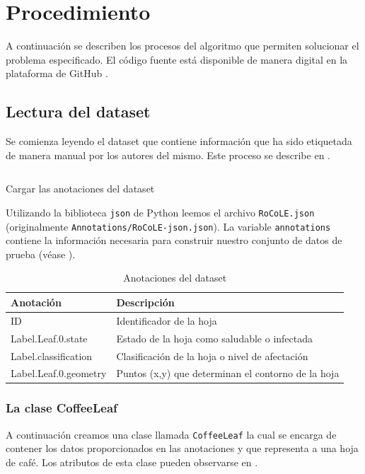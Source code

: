 \chapter{Procedimiento}
A continuación se describen los procesos del algoritmo que permiten solucionar el problema especificado. El código fuente está disponible de manera digital en la plataforma de GitHub \cite{LindermanDgz}.

\section{Lectura del dataset}
Se comienza leyendo el dataset que contiene información que ha sido etiquetada de manera manual por los autores del mismo. Este proceso se describe en .

\begin{listing}[H]
\inputminted{python}{code_listings/load_dataset.py}
\caption{Cargar las anotaciones del dataset}
\label{code:load_dataset}
\end{listing}

Utilizando la biblioteca \texttt{json} de Python leemos el archivo \texttt{RoCoLE.json} (originalmente \texttt{Annotations/RoCoLE-json.json}). La variable \texttt{annotations} contiene la información necesaria para construir nuestro conjunto de datos de prueba (véase ).

\begin{table}[H]
\centering
\begin{tabular}{|l|l|}
\hline 
\textbf{Anotación} & \textbf{Descripción} \\ 
\hline 
ID & Identificador de la hoja \\ 
\hline 
Label.Leaf.0.state & Estado de la hoja como saludable o infectada \\ 
\hline 
Label.classification & Clasificación de la hoja o nivel de afectación \\ 
\hline 
Label.Leaf.0.geometry & Puntos (x,y) que determinan el contorno de la hoja \\ 
\hline 
\end{tabular}
\caption{Anotaciones del dataset}
\label{table:required_annotations}
\end{table}

\subsection{La clase CoffeeLeaf}
A continuación creamos una clase llamada \texttt{CoffeeLeaf} la cual se encarga de contener los datos proporcionados en las anotaciones y que representa a una hoja de café. Los atributos de esta clase pueden observarse en .

